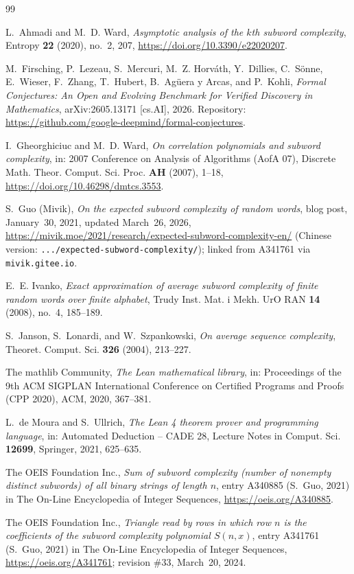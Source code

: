 \documentclass[11pt]{amsart}
\theoremstyle{plain}
\theoremstyle{definition}
\begin{document}
{\footnotesize
\begin{thebibliography}{99}

L.~Ahmadi and M.~D. Ward, \emph{Asymptotic analysis of the $k$th subword complexity}, Entropy \textbf{22} (2020), no.~2, 207, \url{https://doi.org/10.3390/e22020207}.

M.~Firsching, P.~Lezeau, S.~Mercuri, M.~Z. Horv\'ath, Y.~Dillies, C.~S\"onne, E.~Wieser, F.~Zhang, T.~Hubert, B.~Ag\"uera y Arcas, and P.~Kohli, \emph{Formal Conjectures: An Open and Evolving Benchmark for Verified Discovery in Mathematics}, arXiv:2605.13171 [cs.AI], 2026. Repository: \url{https://github.com/google-deepmind/formal-conjectures}.

I.~Gheorghiciuc and M.~D. Ward, \emph{On correlation polynomials and subword complexity}, in: 2007 Conference on Analysis of Algorithms (AofA 07), Discrete Math. Theor. Comput. Sci. Proc. \textbf{AH} (2007), 1--18, \url{https://doi.org/10.46298/dmtcs.3553}.

S.~Guo (Mivik), \emph{On the expected subword complexity of random words}, blog post, January~30, 2021, updated March~26, 2026, \url{https://mivik.moe/2021/research/expected-subword-complexity-en/} (Chinese version: \texttt{.../expected-subword-complexity/}); linked from A341761 via \texttt{mivik.gitee.io}.

E.~E. Ivanko, \emph{Exact approximation of average subword complexity of finite random words over finite alphabet}, Trudy Inst. Mat. i Mekh. UrO RAN \textbf{14} (2008), no.~4, 185--189.

S.~Janson, S.~Lonardi, and W.~Szpankowski, \emph{On average sequence complexity}, Theoret. Comput. Sci. \textbf{326} (2004), 213--227.

The mathlib Community, \emph{The Lean mathematical library}, in: Proceedings of the 9th ACM SIGPLAN International Conference on Certified Programs and Proofs (CPP 2020), ACM, 2020, 367--381.

L.~de Moura and S.~Ullrich, \emph{The Lean 4 theorem prover and programming language}, in: Automated Deduction -- CADE 28, Lecture Notes in Comput. Sci. \textbf{12699}, Springer, 2021, 625--635.

The OEIS Foundation Inc., \emph{Sum of subword complexity (number of nonempty distinct subwords) of all binary strings of length $n$}, entry A340885 (S.~Guo, 2021) in The On-Line Encyclopedia of Integer Sequences, \url{https://oeis.org/A340885}.

The OEIS Foundation Inc., \emph{Triangle read by rows in which row $n$ is the coefficients of the subword complexity polynomial $S(n,x)$}, entry A341761 (S.~Guo, 2021) in The On-Line Encyclopedia of Integer Sequences, \url{https://oeis.org/A341761}; revision \#33, March~20, 2024.

\end{thebibliography}
}
\end{document}
